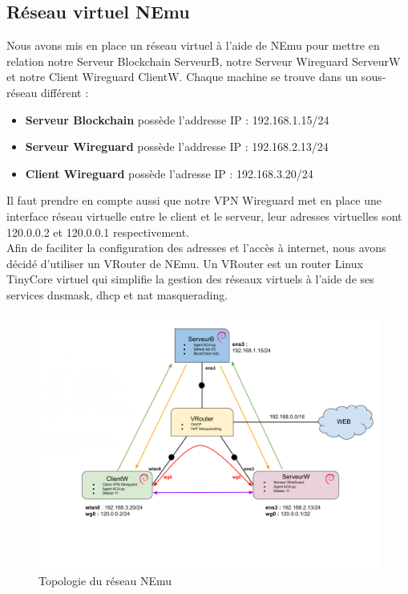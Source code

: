 \documentclass[12pt, openany]{report}
\begin{document}
\subsection{Réseau virtuel NEmu}
\noindent 
\begin{flushleft}

Nous avons mis en place un réseau virtuel à l'aide de NEmu pour mettre en relation notre Serveur Blockchain ServeurB, notre Serveur Wireguard ServeurW et notre Client Wireguard ClientW. Chaque machine se trouve dans un sous-réseau différent : 
\begin{itemize}
\item \textbf{Serveur Blockchain} possède l'addresse IP : 192.168.1.15/24
\item \textbf{Serveur Wireguard} possède l'addresse IP : 192.168.2.13/24
\item \textbf{Client Wireguard} possède l'adresse IP : 192.168.3.20/24
\end{itemize}
Il faut prendre en compte aussi que notre VPN Wireguard met en place une interface réseau virtuelle entre le client et le serveur, leur adresses virtuelles sont 120.0.0.2 et 120.0.0.1 respectivement. \\
Afin de faciliter la configuration des adresses et l'accès à internet, nous avons décidé d'utiliser un VRouter de NEmu. Un VRouter est un router Linux TinyCore virtuel qui simplifie la gestion des réseaux virtuels à l'aide de ses services dnsmask, dhcp et nat masquerading.

\begin{figure}[H]
\includegraphics[scale=0.4]{topo.png}
\centering
\caption{Topologie du réseau NEmu}
\end{figure}


\end{flushleft}
\end{document}
